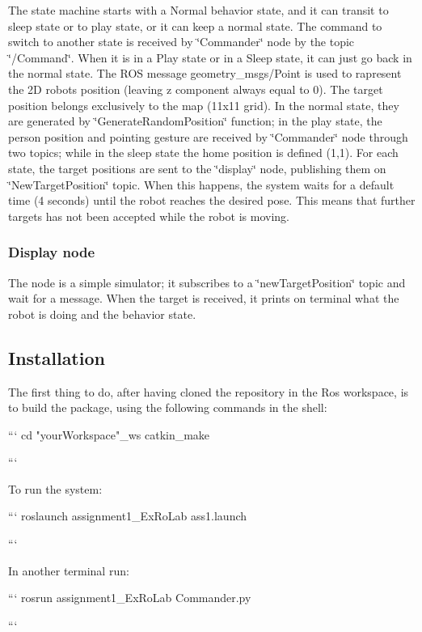 The state machine starts with a Normal behavior state, and it can transit to sleep state or to play state, or it can keep a normal state. The command to switch to another state is received by \char`\"{}\+Commander\char`\"{} node by the topic \char`\"{}/\+Command\char`\"{}. When it is in a Play state or in a Sleep state, it can just go back in the normal state. The R\+OS message geometry\+\_\+msgs/\+Point is used to rapresent the 2D robot\textquotesingle{}s position (leaving z component always equal to 0). The target position belongs exclusively to the map (11x11 grid). In the normal state, they are generated by \char`\"{}\+Generate\+Random\+Position\char`\"{} function; in the play state, the person position and pointing gesture are received by \char`\"{}\+Commander\char`\"{} node through two topics; while in the sleep state the home position is defined (1,1). For each state, the target positions are sent to the \char`\"{}display\char`\"{} node, publishing them on \char`\"{}\+New\+Target\+Position\char`\"{} topic. When this happens, the system waits for a default time (4 seconds) until the robot reaches the desired pose. This means that further targets has not been accepted while the robot is moving.

\subsubsection*{Display node}

The node is a simple simulator; it subscribes to a \char`\"{}new\+Target\+Position\char`\"{} topic and wait for a message. When the target is received, it prints on terminal what the robot is doing and the behavior state.

\subsection*{Installation}

The first thing to do, after having cloned the repository in the Ros workspace, is to build the package, using the following commands in the shell\+: \begin{DoxyVerb}```
cd "yourWorkspace"_ws
catkin_make

```
\end{DoxyVerb}
 To run the system\+: \begin{DoxyVerb}```
roslaunch assignment1_ExRoLab ass1.launch

```
\end{DoxyVerb}
 In another terminal run\+: \begin{DoxyVerb}```
rosrun assignment1_ExRoLab Commander.py 

```
\end{DoxyVerb}



